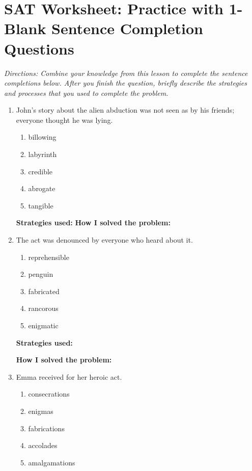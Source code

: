 \section{SAT Worksheet: Practice with 1-Blank Sentence Completion Questions}

\textit{Directions: Combine your knowledge from this lesson to complete the sentence completions below. After you finish the question, briefly describe the strategies and processes that you used to complete the problem.}
\begin{enumerate}


\item John’s story about the alien abduction was not seen as by \underline{\hspace{2in}} his friends; everyone thought he was lying.

\begin{enumerate}[label=(\Alph*)]
\item billowing  
\item labyrinth 
\item credible
\item abrogate 
\item tangible 
\end{enumerate}

\large{\textbf{Strategies used:}} \hrulefill
\large{\textbf{How I solved the problem:}} \hrulefill

\item The \underline{\hspace{2in}} act was denounced by everyone who heard about it.

\begin{enumerate}[label=(\Alph*)] 
\item reprehensible
\item penguin  
\item fabricated
\item rancorous 
\item enigmatic   
\end{enumerate}

\large{\textbf{Strategies used:}} \hrulefill

\large{\textbf{How I solved the problem:}} \hrulefill

\item Emma received \underline{\hspace{2in}} for her heroic act.
 
\begin{enumerate} [label=(\Alph*)]
\item consecrations 
\item enigmas 
\item fabrications 
\item accolades 
\item amalgamations  
\end{enumerate}


\end{enumerate}
